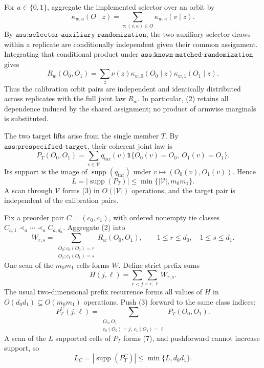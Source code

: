 For \(a\in\{0,1\}\), aggregate the implemented selector over an orbit by
\[
\kappa_{w,a}(O\mid z)=\sum_{v:(v,a)\in O}\kappa_{w,a}(v\mid z). \tag{1}
\]
By \(\texttt{ass:selector-auxiliary-randomization}\), the two auxiliary selector draws within a replicate are conditionally independent given their common assignment. Integrating that conditional product under \(\texttt{ass:known-matched-randomization}\) gives
\[
R_w(O_0,O_1)=\sum_z\nu(z)\kappa_{w,0}(O_0\mid z)\kappa_{w,1}(O_1\mid z). \tag{2}
\]
Thus the calibration orbit pairs are independent and identically distributed across replicates with the full joint law \(R_w\). In particular, (2) retains all dependence induced by the shared assignment; no product of armwise marginals is substituted.

The two target lifts arise from the single member \(T\). By \(\texttt{ass:prespecified-target}\), their coherent joint law is
\[
P_T(O_0,O_1)=\sum_{v\in\mathcal V}q_{\mathrm{tar}}(v)\mathbf 1\{O_0(v)=O_0,\ O_1(v)=O_1\}. \tag{3}
\]
Its support is the image of \(\operatorname{supp}(q_{\mathrm{tar}})\) under \(v\mapsto(O_0(v),O_1(v))\). Hence
\[
L=|\operatorname{supp}(P_T)|\le \min\{|\mathcal V|,m_0m_1\}. \tag{4}
\]
A scan through \(\mathcal V\) forms (3) in \(O(|\mathcal V|)\) operations, and the target pair is independent of the calibration pairs.

Fix a preorder pair \(C=(c_0,c_1)\), with ordered nonempty tie classes \(C_{a,1}\prec_a\cdots\prec_a C_{a,d_a}\). Aggregate (2) into
\[
W_{r,s}=\sum_{\substack{O_0:c_0(O_0)=r\\O_1:c_1(O_1)=s}}R_w(O_0,O_1),\qquad 1\le r\le d_0,\quad 1\le s\le d_1. \tag{5}
\]
One scan of the \(m_0m_1\) cells forms \(W\). Define strict prefix sums
\[
H(j,\ell)=\sum_{r<j}\sum_{s<\ell}W_{r,s}. \tag{6}
\]
The usual two-dimensional prefix recurrence forms all values of \(H\) in \(O(d_0d_1)\subseteq O(m_0m_1)\) operations. Push (3) forward to the same class indices:
\[
P_T^C(j,\ell)=\sum_{\substack{O_0,O_1\\c_0(O_0)=j,\ c_1(O_1)=\ell}}P_T(O_0,O_1). \tag{7}
\]
A scan of the \(L\) supported cells of \(P_T\) forms (7), and pushforward cannot increase support, so
\[
L_C=|\operatorname{supp}(P_T^C)|\le\min\{L,d_0d_1\}. \tag{8}
\]

